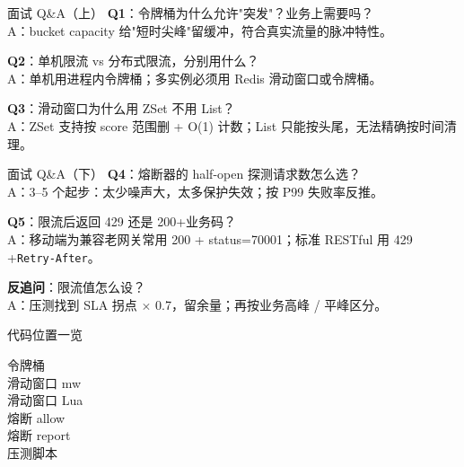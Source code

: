 \appendix

\begin{frame}{面试 Q\&A（上）}
\textbf{Q1}：令牌桶为什么允许"突发"？业务上需要吗？\\
\hspace{4mm}\small A：bucket capacity 给"短时尖峰"留缓冲，符合真实流量的脉冲特性。

\vspace{2mm}
\textbf{Q2}：单机限流 vs 分布式限流，分别用什么？\\
\hspace{4mm}\small A：单机用进程内令牌桶；多实例必须用 Redis 滑动窗口或令牌桶。

\vspace{2mm}
\textbf{Q3}：滑动窗口为什么用 ZSet 不用 List？\\
\hspace{4mm}\small A：ZSet 支持按 score 范围删 + O(1) 计数；List 只能按头尾，无法精确按时间清理。
\end{frame}

\begin{frame}{面试 Q\&A（下）}
\textbf{Q4}：熔断器的 half-open 探测请求数怎么选？\\
\hspace{4mm}\small A：3--5 个起步：太少噪声大，太多保护失效；按 P99 失败率反推。

\vspace{2mm}
\textbf{Q5}：限流后返回 429 还是 200+业务码？\\
\hspace{4mm}\small A：移动端为兼容老网关常用 200 + status=70001；标准 RESTful 用 429 +\texttt{Retry-After}。

\vspace{2mm}
\textbf{反追问}：限流值怎么设？\\
\hspace{4mm}\small A：压测找到 SLA 拐点 $\times$ 0.7，留余量；再按业务高峰 / 平峰区分。
\end{frame}

\begin{frame}{代码位置一览}
\begin{description}
  \item[令牌桶]
  \item[滑动窗口 mw]
  \item[滑动窗口 Lua]
  \item[熔断 allow]
  \item[熔断 report]
  \item[压测脚本]
\end{description}
\vspace{2mm}
\end{frame}


